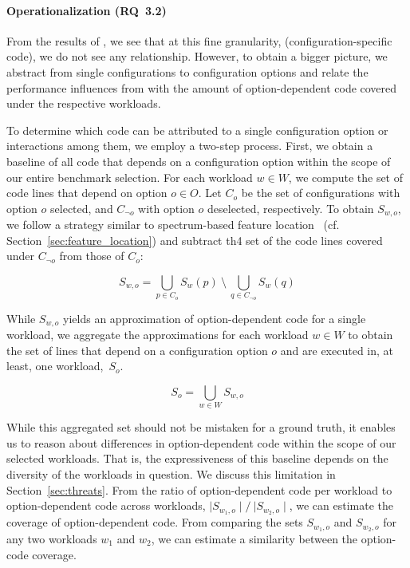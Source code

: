 \paragraph*{Operationalization (RQ~3.2)}
{\color{blue}From the results of , we see that at this fine granularity,  (configuration-specific code), we do not see any relationship. However, to obtain a bigger picture, we abstract from single configurations to configuration options and relate the performance influences from  with the amount of option-dependent code covered under the respective workloads.}

To determine which code can be attributed to a single configuration option or interactions among them, we employ a two-step process. First, we obtain a baseline of all code that depends on a configuration option within the scope of our entire benchmark selection. For each workload $w \in W$, we compute the set of code lines that depend on option $o \in O$. Let $C_{o}$ be the set of configurations with option $o$ selected, and $C_{\neg o}$ with option $o$ deselected, respectively. To obtain $S_{w, o}$, we follow a strategy similar to spectrum-based feature location~\cite{michelon_spectrum_2021} (cf. Section~\ref{sec:feature_location}) and subtract th4 set of the code lines covered under $C_{\neg o}$ from those of $C_{o}$:

\begin{equation}
	S_{w, o} = \bigcup_{p \in C_{o}} S_{w}(p) ~ \setminus ~ \bigcup_{q \in C_{\neg o}} S_{w}(q)
\end{equation}

While $S_{w, o}$ yields an approximation of option-dependent code for a single workload, we aggregate the approximations for each workload $w \in W$ to obtain the set of lines that depend on a configuration option $o$ and are executed in, at least, one workload,~$S_{o}$. 

\begin{equation}
	S_{o} = \bigcup_{w \in W} S_{w, o}
\end{equation}

While this aggregated set should not be mistaken for a ground truth, it enables us to reason about differences in option-dependent code within the scope of our selected workloads. That is, the expressiveness of this baseline depends on the diversity of the workloads in question. We discuss this limitation in Section~\ref{sec:threats}. From the ratio of option-dependent code per workload to option-dependent code across workloads, $\mid S_{w_1, o}\mid/~{\mid S_{w_2, o}\mid}$, we can estimate the coverage of option-dependent code. From comparing the sets $S_{w_1, o}$ and $S_{w_2, o}$ for any two workloads $w_1$ and $w_2$, we can estimate a similarity between the option-code coverage.

